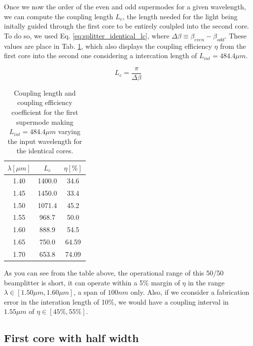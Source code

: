 \documentclass[conference, a4paper]{IEEEtran}
\begin{document}
Once we now the order of the even and odd supermodes for a given wavelength, we can compute the coupling length $L_c$, the length needed for the light being initally guided through the first core to be entirely coulpled into the second core. To do so, we used Eq. \eqref{eq:splitter_identical_lc}, where $\Delta \beta \equiv \beta_{even} - \beta_{odd}$. These values are place in Tab. \ref{tab:splitter_identical_lc}, which also displays the coupling efficiency $\eta$ from the first core into the second one considering a intercation length of $L_{int} = 484.4\mu m$.

\begin{equation}
    L_c = \frac{\pi}{\Delta \beta}
    \label{eq:splitter_identical_lc}
\end{equation}

\begin{table}[H]
    \centering
    \begin{tabular}{ccc}
        \toprule
        $\lambda [\mu m]$ & $L_c$ & $\eta[\%]$ \\
        \midrule
        1.40 & 1400.0 & 34.6 \\
        1.45 & 1450.0 & 33.4 \\
        1.50 & 1071.4 & 45.2 \\
        1.55 & 968.7 & 50.0 \\
        1.60 & 888.9 & 54.5 \\
        1.65 & 750.0 & 64.59 \\
        1.70 & 653.8 & 74.09 \\    
        \bottomrule
    \end{tabular}
    \caption{Coupling length and coupling efficiency coefficient for the first supermode making $L_{int} = 484.4\mu m$ varying the input wavelength for the identical cores.}
    \label{tab:splitter_identical_lc}
\end{table}

As you can see from the table above, the operational range of this 50/50 beamplitter is short, it can operate within a 5\% margin of $\eta$ in the range $\lambda \in [1.50\mu m, 1.60\mu m]$, a span of $100nm$ only. Also, if we cconsider a fabrication error in the interation length of 10\%, we would have a coupling interval in $1.55 \mu m$ of $\eta \in [45\%, 55\%]$.  

\subsection{First core with half width}
\label{subsec:splitter_doubled}
\end{document}
